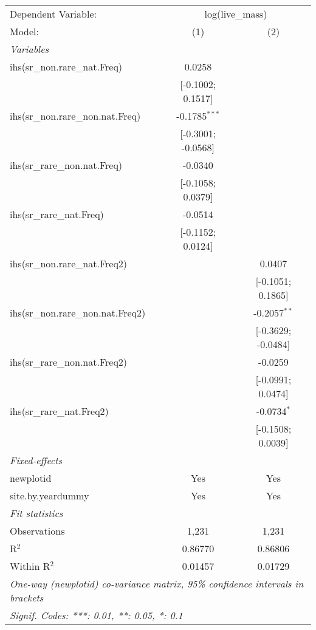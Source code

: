 \begin{tabular}{lcc}
\tabularnewline\midrule\midrule
Dependent Variable:&\multicolumn{2}{c}{log(live\_mass)}\\
Model:&(1) & (2)\\
\midrule \emph{Variables}&   &  \\
ihs(sr\_non.rare\_nat.Freq)&0.0258 &   \\
  &[-0.1002; 0.1517] &   \\
ihs(sr\_non.rare\_non.nat.Freq)&-0.1785$^{***}$ &   \\
  &[-0.3001; -0.0568] &   \\
ihs(sr\_rare\_non.nat.Freq)&-0.0340 &   \\
  &[-0.1058; 0.0379] &   \\
ihs(sr\_rare\_nat.Freq)&-0.0514 &   \\
  &[-0.1152; 0.0124] &   \\
ihs(sr\_non.rare\_nat.Freq2)&   & 0.0407\\
  &   & [-0.1051; 0.1865]\\
ihs(sr\_non.rare\_non.nat.Freq2)&   & -0.2057$^{**}$\\
  &   & [-0.3629; -0.0484]\\
ihs(sr\_rare\_non.nat.Freq2)&   & -0.0259\\
  &   & [-0.0991; 0.0474]\\
ihs(sr\_rare\_nat.Freq2)&   & -0.0734$^{*}$\\
  &   & [-0.1508; 0.0039]\\
\midrule \emph{Fixed-effects}&   &  \\
newplotid & Yes & Yes\\
site.by.yeardummy & Yes & Yes\\
\midrule \emph{Fit statistics}&  & \\
Observations & 1,231&1,231\\
R$^2$ & 0.86770&0.86806\\
Within R$^2$ & 0.01457&0.01729\\
\midrule\midrule\multicolumn{3}{l}{\emph{One-way (newplotid) co-variance matrix, 95\% confidence intervals in brackets}}\\
\multicolumn{3}{l}{\emph{Signif. Codes: ***: 0.01, **: 0.05, *: 0.1}}\\
\end{tabular}





